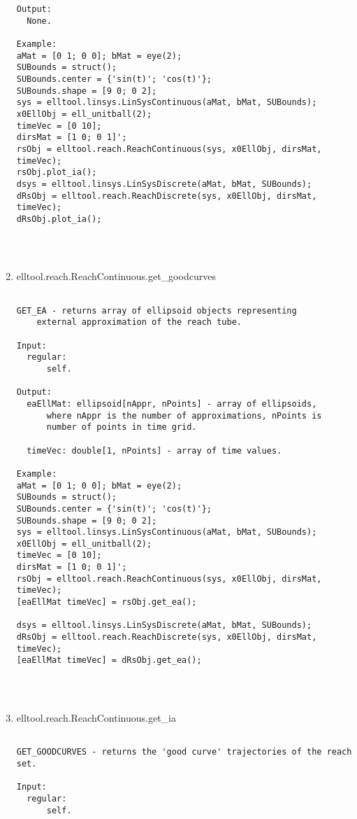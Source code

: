\begin{enumerate}
\begin{lstlisting}
Output:
  None.

Example:
aMat = [0 1; 0 0]; bMat = eye(2);
SUBounds = struct();
SUBounds.center = {'sin(t)'; 'cos(t)'};
SUBounds.shape = [9 0; 0 2];
sys = elltool.linsys.LinSysContinuous(aMat, bMat, SUBounds);
x0EllObj = ell_unitball(2);
timeVec = [0 10];
dirsMat = [1 0; 0 1]';
rsObj = elltool.reach.ReachContinuous(sys, x0EllObj, dirsMat, timeVec);
rsObj.plot_ia();
dsys = elltool.linsys.LinSysDiscrete(aMat, bMat, SUBounds);
dRsObj = elltool.reach.ReachDiscrete(sys, x0EllObj, dirsMat, timeVec);
dRsObj.plot_ia();




\end{lstlisting}
\fontfamily{\familydefault}
\selectfont
\item {elltool.reach.ReachContinuous.get\_goodcurves}
\selectfont
\begin{lstlisting}

GET_EA - returns array of ellipsoid objects representing
    external approximation of the reach tube.

Input:
  regular:
      self.

Output:
  eaEllMat: ellipsoid[nAppr, nPoints] - array of ellipsoids,
      where nAppr is the number of approximations, nPoints is
      number of points in time grid.

  timeVec: double[1, nPoints] - array of time values.

Example:
aMat = [0 1; 0 0]; bMat = eye(2);
SUBounds = struct();
SUBounds.center = {'sin(t)'; 'cos(t)'};
SUBounds.shape = [9 0; 0 2];
sys = elltool.linsys.LinSysContinuous(aMat, bMat, SUBounds);
x0EllObj = ell_unitball(2);
timeVec = [0 10];
dirsMat = [1 0; 0 1]';
rsObj = elltool.reach.ReachContinuous(sys, x0EllObj, dirsMat, timeVec);
[eaEllMat timeVec] = rsObj.get_ea();

dsys = elltool.linsys.LinSysDiscrete(aMat, bMat, SUBounds);
dRsObj = elltool.reach.ReachDiscrete(sys, x0EllObj, dirsMat, timeVec);
[eaEllMat timeVec] = dRsObj.get_ea();




\end{lstlisting}
\fontfamily{\familydefault}
\selectfont
\item {elltool.reach.ReachContinuous.get\_ia}
\selectfont
\begin{lstlisting}

GET_GOODCURVES - returns the 'good curve' trajectories of the reach set.

Input:
  regular:
      self.


\end{lstlisting}
\end{enumerate}
